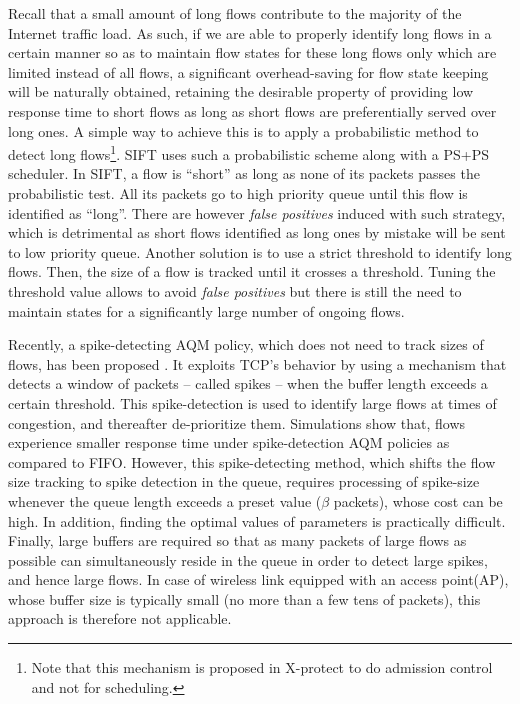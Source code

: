 \documentclass[preprint,12pt]{elsarticle}
\begin{document}
Recall that a small amount of long flows contribute to the majority of the Internet traffic load. As such, if we are able to properly identify long flows in a certain manner so as to maintain flow states for these long flows only which are limited instead of all flows, a significant overhead-saving for flow state keeping will be naturally obtained, retaining the desirable property of providing low response time to short flows as long as short flows are preferentially served over long ones. A simple way to achieve this is to apply a probabilistic method to detect long flows\footnote{Note that this mechanism is proposed in X-protect \cite{Kortebi04Xprotect} to do admission control  and not for scheduling.}\cite{Kortebi04Xprotect,Psounis05Sift}. SIFT \cite{Psounis05Sift} uses such a probabilistic scheme along with a PS+PS scheduler. In SIFT, a flow is ``short'' as long as none of its packets passes the probabilistic test. All its packets go to high priority queue until this flow is identified as ``long''. There are however \textit{false positives} induced with such strategy, which is detrimental as short flows identified as long ones by mistake will be sent to low priority queue. Another solution \cite{DivakaranCAP10} is to use a strict threshold to identify long flows. Then, the size of a flow is tracked until it crosses a threshold. Tuning the threshold value allows to avoid  \textit{false positives}  but there is still the need to maintain states for a significantly large number of ongoing flows. 

Recently, a spike-detecting AQM policy, which does not need to track sizes of flows, has been proposed  \cite{DivakaranAP11,Divakaran2012networks}. It exploits TCP's behavior by using a mechanism that detects a window of packets -- called spikes -- when the buffer length exceeds a certain threshold. This spike-detection is used to identify large flows at times of congestion, and thereafter de-prioritize them. Simulations  \cite{DivakaranAP11,Divakaran2012networks}  show   that, flows experience smaller response time under spike-detection AQM policies as compared to FIFO. However, this spike-detecting method, which shifts the flow size tracking to spike detection in the queue, requires processing of spike-size  whenever the queue length exceeds a preset value ($\beta$ packets), whose cost can be high. In addition, finding the optimal values of parameters is practically difficult.%
Finally, large buffers are required so that as many packets of large flows as possible can simultaneously reside in the queue in order to detect large spikes, and hence large flows. In case of wireless link equipped with an access point(AP), whose buffer size is typically small (no more than a few tens of packets), this approach is therefore not applicable.
\end{document}
